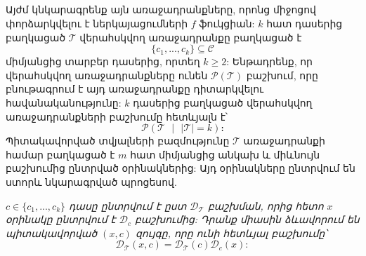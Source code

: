 \documentclass[12pt]{article}
\begin{document}
\begin{center}
\subsection*{
 } 
 \end{center}
 \noindent
{}
{}

\par Այժմ կնկարագրենք այն առաջադրանքները, որոնց միջոցով փորձարկվելու է ներկայացումների $f$ ֆուկցիան: $k$ հատ դասերից բաղկացած $\mathcal{T}$ վերահսկվող առաջադրանքը բաղկացած է $$\{c_1, ..., c_{k}\} \subseteq \mathcal{C}$$
միմյանցից տարբեր դասերից, որտեղ $k \geq 2$: Ենթադրենք, որ վերահսկվող առաջադրանքները ունեն $\mathcal{P}(\mathcal{T})$ բաշխում, որը բնութագրում է այդ առաջադրանքը դիտարկվելու հավանականությունը: $k$ դասերից բաղկացած վերահսկվող առաջադրանքների բաշխումը հետևյալն է՝ $$\mathcal{P}(\mathcal{T} \text{ } |\text{ }  |\mathcal{T}| = k )։$$ Պիտակավորված տվյալների բազմությունը $\mathcal{T}$ առաջադրանքի համար բաղկացած է $m$ հատ միմյանցից անկախ և միևնույն բաշխումից ընտրված օրինակներից: Այդ օրինակները ընտրվում են ստորև նկարագրված պրոցեսով.

\textit{$c \in \{c_1, ..., c_{k}\} $   դասը ընտրվում է ըստ $\mathcal{D}_{\mathcal{T}}$ բաշխման, որից հետո $x$ օրինակը ընտրվում է $\mathcal{D}_c$ բաշխումից: Դրանք միասին ձևավորում են պիտակավորված $(x, c)$ զույգը, որը ունի հետևյալ բաշխումը՝
$$\mathcal{D}_{\mathcal{T}} (x, c) = \mathcal{D}_{\mathcal{T}}(c)\mathcal{D}_{c}(x):$$}

\begin{center}
\subsection*{
 } 
 \end{center}
 \noindent
{}
{}
\end{document}
